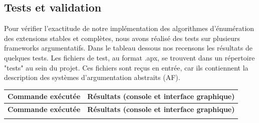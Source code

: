 \documentclass{rapportECL}
\begin{document}
\subsection{Tests et validation}

Pour vérifier l'exactitude de notre implémentation des algorithmes d'énumération des extensions stables et complètes, nous avons réalisé des tests sur plusieurs frameworks argumentatifs. Dans le tableau dessous nos recensons les résultats de quelques tests. 
Les fichiers de test, au format .apx, se trouvent dans un répertoire "tests" au sein du projet. Ces fichiers sont reçus en entrée, car ils contiennent la description des systèmes d'argumentation abstraits (AF).
\vspace{0.5cm}
\noindent


\begin{longtable}{|p{7cm}|p{7cm}|}
	\hline
	\textbf{Commande exécutée} & \textbf{Résultats (console et interface graphique)} \\ 
	\hline
	\endfirsthead
	\hline
	\textbf{Commande exécutée} & \textbf{Résultats (console et interface graphique)} \\ 
	\hline
	\endhead
	\hline
	\endfoot
	


\end{longtable}
\end{document}
